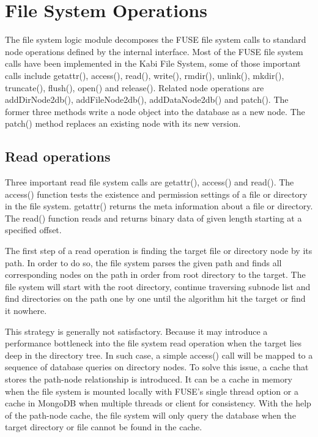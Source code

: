 \section{File System Operations}

    The file system logic module decomposes the FUSE file system calls to standard node operations defined by the internal interface. Most of the FUSE file system calls have been implemented in the Kabi File System, some of those important calls include getattr(), access(), read(), write(), rmdir(), unlink(), mkdir(), truncate(), flush(), open() and release(). Related node operations are addDirNode2db(), addFileNode2db(), addDataNode2db() and patch(). The former three methods write a node object into the database as a new node. The patch() method replaces an existing node with its new version.

\subsection{Read operations}

    Three important read file system calls are getattr(), access() and read(). The access() function tests the existence and permission settings of a file or directory in the file system. getattr() returns the meta information about a file or directory. The read() function reads and returns binary data of given length starting at a specified offset.

    The first step of a read operation is finding the target file or directory node by its path. In order to do so, the file system parses the given path and finds all corresponding nodes on the path in order from root directory to the target. The file system will start with the root directory, continue traversing subnode list and find directories on the path one by one until the algorithm hit the target or find it nowhere.

    This strategy is generally not satisfactory. Because it may introduce a performance bottleneck into the file system read operation when the target lies deep in the directory tree. In such case, a simple access() call will be mapped to a sequence of database queries on directory nodes. To solve this issue, a cache that stores the path-node relationship is introduced. It can be a cache in memory when the file system is mounted locally with FUSE's single thread option or a cache in MongoDB when multiple threads or client for consistency. With the help of the path-node cache, the file system will only query the database when the target directory or file cannot be found in the cache.

